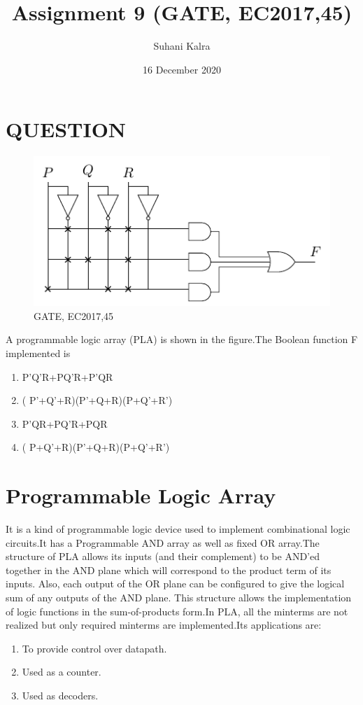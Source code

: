 \documentclass{report}
\title{Assignment 9 (GATE, EC2017,45)}
\author{Suhani Kalra }
\date{16 December 2020}
\begin{document}
\maketitle
\section{QUESTION}
\begin{figure}[htp]
        \centering
        \includegraphics[width=17cm]{image.pdf}
        \caption{GATE, EC2017,45}
        \label{fig:ok}
\end{figure}
\huge
A programmable logic array (PLA) is shown in the figure.The Boolean function F implemented is

 \begin{enumerate}
 \item P'Q'R+PQ'R+P'QR
\item ( P'+Q'+R)(P'+Q+R)(P+Q'+R')
\item P'QR+PQ'R+PQR
\item ( P+Q'+R)(P'+Q+R)(P+Q'+R')
  \end{enumerate}





\newpage
\section{Programmable Logic Array}
 It is a kind of programmable logic device used to implement combinational logic circuits.It has a Programmable AND array as well as fixed OR array.The structure of PLA allows its inputs (and their complement) to be AND’ed together in the AND plane which will correspond to the product term of its inputs. Also, each output of the OR plane can be configured to give the logical sum of any outputs of the AND plane. This structure allows the implementation of logic functions in the sum-of-products form.In PLA, all the minterms are not realized but only required minterms are implemented.Its applications are:
 \begin{enumerate}
 \item To provide control over datapath.

\item Used as a counter.

\item Used as decoders.

  \end{enumerate}
\newpage
\end{document}
